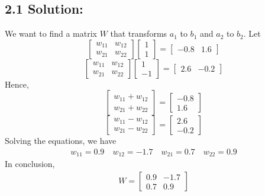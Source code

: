 \documentclass{article}
\begin{document}
\subsection*{2.1 Solution:}
We want to find a matrix $W$ that transforms $a_1$ to $b_1$ and $a_2$ to $b_2$.
Let
\[
\begin{bmatrix} w_{11} & w_{12} \\ w_{21} & w_{22} \end{bmatrix} \begin{bmatrix} 1 \\ 1 \end{bmatrix} = \begin{bmatrix} -0.8 & 1.6 \end{bmatrix}
\]
\[
\begin{bmatrix} w_{11} & w_{12} \\ w_{21} & w_{22} \end{bmatrix} \begin{bmatrix} 1 \\ -1 \end{bmatrix} = \begin{bmatrix} 2.6 & -0.2 \end{bmatrix}
\]
Hence,
\[
\begin{bmatrix} w_{11} + w_{12} \\ w_{21} + w_{22} \end{bmatrix} = \begin{bmatrix} -0.8 \\ 1.6 \end{bmatrix}
\]
\[
\begin{bmatrix} w_{11} - w_{12} \\ w_{21} - w_{22} \end{bmatrix} = \begin{bmatrix} 2.6 \\ -0.2 \end{bmatrix}
\]
Solving the equations, we have
\begin{align*}
    w_{11} = 0.9 \quad w_{12} = -1.7 \quad w_{21} = 0.7 \quad w_{22} = 0.9
\end{align*}
In conclusion, 
\begin{align*}
    W = \begin{bmatrix} 0.9 & -1.7 \\ 0.7 & 0.9 \end{bmatrix}
\end{align*}
\end{document}
